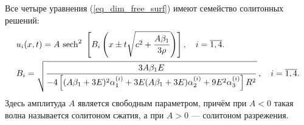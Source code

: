 \documentclass[12pt, a4paper]{article}
\begin{document}

Все четыре уравнения (\ref{eq_dim_free_surf}) имеют семейство солитонных решений:
\begin{align}
\label{soliton}
&u_i(x,t) = A\ {\rm sech}^2\ \left[B_{i} \left(x\pm t \sqrt{c^2+\frac{A \beta_1}{3 \rho}}\right) \right], \quad i = \overline {1,4}.\\
&B_i = \sqrt{\frac{3A\beta_1 E}{-4\left[(A\beta_1 + 3E)^2\alpha_1^{(i)} + 3E(A\beta_1 + 3E)\alpha_2^{(i)} + 9E^2\alpha_3^{(i)}\right] R^2}} \, , \quad i = \overline {1,4}.
\end{align}
Здесь амплитуда $A$ является свободным параметром, причём при $A<0$ такая волна называется солитоном сжатия, а при $A>0$ --- солитоном разрежения.
\end{document}
